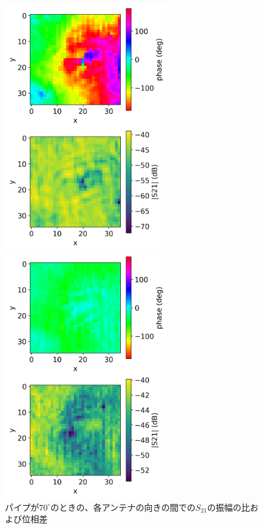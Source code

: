 \documentclass[11pt,a4paper,uplatex]{ujarticle}
\begin{document}
\begin{figure}[tbp]
    \begin{minipage}[b]{0.495\textwidth}
      \centering
      \includegraphics[keepaspectratio, width=70mm]{Images/python/rowdata/130.png}
    \end{minipage}
    \begin{minipage}[b]{0.495\textwidth}
      \centering
      \includegraphics[keepaspectratio, width=70mm]{Images/python/rowdata/180.png}
    \end{minipage}
    \caption{パイプが$70^{\circ}$のときの、各アンテナの向きの間での$S_{21}$の振幅の比および位相差}
  \end{figure}
  
\end{document}
